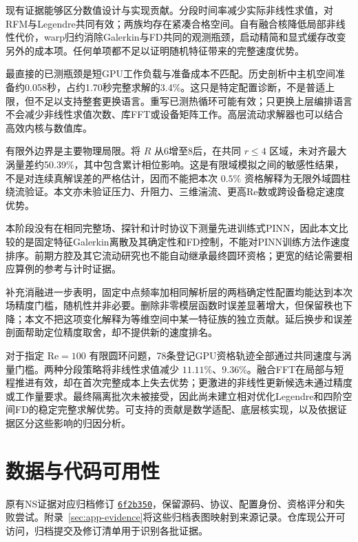 现有证据能够区分数值设计与实现贡献。分段时间率减少实际非线性求值，对RFM与Legendre共同有效；两族均存在紧凑合格空间。自有融合核降低局部非线性代价，warp归约消除Galerkin与FD共同的观测瓶颈，启动精简和显式缓存改变另外的成本项。任何单项都不足以证明随机特征带来的完整速度优势。

最直接的已测瓶颈是短GPU工作负载与准备成本不匹配。历史剖析中主机空间准备约0.058秒，占约1.70秒完整求解的3.4\%。这只是特定配置诊断，不是普适上限，但不足以支持整套更换语言。重写已测热循环可能有效；只更换上层编排语言不会减少非线性求值次数、库FFT或设备矩阵工作。高层流动求解器也可以结合高效内核与数值库\cite{r14}。

有限外边界是主要物理局限。将 $R$ 从6增至8后，在共同 $r\leq4$ 区域，未对齐最大涡量差约50.39\%，其中包含累计相位影响。这是有限域模拟之间的敏感性结果，不是对连续真解误差的严格估计，因而不能把本次 $0.5\%$ 资格解释为无限外域圆柱绕流验证。本文亦未验证压力、升阻力、三维湍流、更高Re数或跨设备稳定速度优势。

本阶段没有在相同完整场、探针和计时协议下测量先进训练式PINN，因此本文比较的是固定特征Galerkin离散及其确定性和FD控制，不能对PINN训练方法作速度排序。前期方腔及其它流动研究也不能自动继承最终圆环资格；更宽的结论需要相应算例的参考与计时证据。

补充消融进一步表明，固定中点频率加相同解析层的两档确定性配置均能达到本次场精度门槛，随机性并非必要。删除非零模层函数时误差显著增大，但保留秩也下降；本文不把这项变化解释为等维空间中某一特征族的独立贡献。延后换步和误差剖面帮助定位精度取舍，却不提供新的速度排名。

\label{sec:conclusion}
对于指定 $\mathrm{Re}=100$ 有限圆环问题，78条登记GPU资格轨迹全部通过共同速度与涡量门槛。两种分段策略将非线性求值减少 $11.11\%$、$9.36\%$。融合FFT在局部与短程推进有效，却在首次完整成本上失去优势；更激进的非线性更新候选未通过精度或工作量要求。最终隔离批次未被接受，因此尚未建立相对优化Legendre和四阶空间FD的稳定完整求解优势。可支持的贡献是数学适配、底层核实现，以及依据证据区分这些影响的归因分析。

\section*{数据与代码可用性}

原有NS证据对应归档修订
\href{https://github.com/LStar404/rfm-navier-stokes-research/tree/6f2b3500964d3d5153b8400018236c4702ef94f8}{\texttt{6f2b350}}，保留源码、协议、配置身份、资格评分和失败尝试。附录~\ref{sec:app-evidence}将这些归档表图映射到来源记录。仓库现公开可访问，归档提交及修订清单用于识别各批证据。

